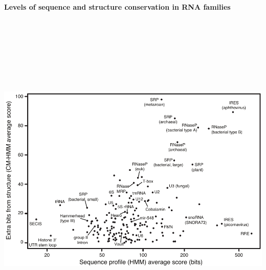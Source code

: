\documentclass[landscape]{slides}
\begin{document}
\begin{slide}
\begin{center}
\textbf{Levels of sequence and structure conservation in RNA families}
\end{center}
\medskip

\begin{center}
\includegraphics[height=6.5in]{figs/avgscores-rfam11}
\end{center}

\vfill

\end{slide}
\end{document}
